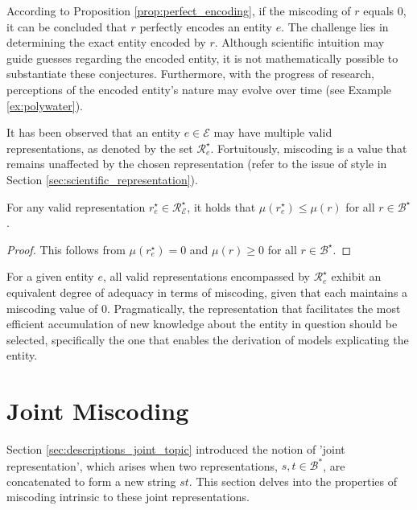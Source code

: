 According to Proposition \ref{prop:perfect_encoding}, if the miscoding of $r$ equals 0, it can be concluded that $r$ perfectly encodes an entity $e$. The challenge lies in determining the exact entity encoded by $r$. Although scientific intuition may guide guesses regarding the encoded entity, it is not mathematically possible to substantiate these conjectures. Furthermore, with the progress of research, perceptions of the encoded entity's nature may evolve over time (see Example \ref{ex:polywater}).

It has been observed that an entity $e \in \mathcal{E}$ may have multiple valid representations, as denoted by the set $\mathcal{R}^\star_e$. Fortuitously, miscoding is a value that remains unaffected by the chosen representation (refer to the issue of style in Section \ref{sec:scientific_representation}).

\begin{proposition}
For any valid representation $r^\star_e \in \mathcal{R}^\star_\mathcal{E}$, it holds that $\mu\left( r^\star_e \right) \leq \mu\left( r \right)$ for all $r \in \mathcal{B}^\star$.
\end{proposition}
\begin{proof}
This follows from $\mu\left( r^\star_e \right) = 0$ and $\mu\left( r \right) \geq 0$ for all $r \in \mathcal{B}^\star$.
\end{proof}

For a given entity $e$, all valid representations encompassed by $\mathcal{R}^\star_e$ exhibit an equivalent degree of adequacy in terms of miscoding, given that each maintains a miscoding value of $0$. Pragmatically, the representation that facilitates the most efficient accumulation of new knowledge about the entity in question should be selected, specifically the one that enables the derivation of models explicating the entity.

%
%

\section{Joint Miscoding}
\label{sec:joint_miscoding}

Section \ref{sec:descriptions_joint_topic} introduced the notion of 'joint representation', which arises when two representations, $s, t \in \mathcal{B}^\ast$, are concatenated to form a new string $st$. This section delves into the properties of miscoding intrinsic to these joint representations.

